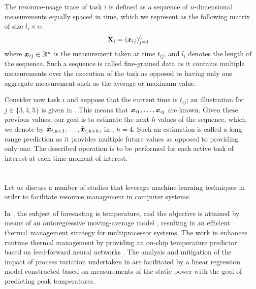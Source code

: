 The resource-usage trace of task $i$ is defined as a sequence of $n$-dimensional
measurements equally spaced in time, which we represent as the following matrix
of size $l_i \times n$:
\[
  \mathbf{X}_i = (\boldsymbol{x}_{ij})_{j = 1}^{l_i}
\]
where $\boldsymbol{x}_{ij} \in \mathbb{R}^n$ is the measurement taken at time $t_{ij}$, and
$l_i$ denotes the length of the sequence. Such a sequence is called fine-grained
data as it contains multiple measurements over the execution of the task as
opposed to having only one aggregate measurement such as the average or maximum
value.

Consider now task $i$ and suppose that the current time is $t_{ij}$; an
illustration for $j \in \{3, 4, 5\}$ is given in . This
means that $\boldsymbol{x}_{i1}, \dots, \boldsymbol{x}_{ij}$ are known. Given these previous values,
our goal is to estimate the next $h$ values of the sequence, which we denote by
$\hat{\boldsymbol{x}}_{i,k + 1}, \dots, \hat{\boldsymbol{x}}_{i,k + h}$; in ,
$h = 4$. Such an estimation is called a long-range prediction as it provides
multiple future values as opposed to providing only one. The described operation
is to be performed for each active task of interest at each time moment of
interest.

\section{\priortitle}

Let us discuss a number of studies that leverage machine-learning techniques in
order to facilitate resource management in computer systems.

In \cite{coskun2008}, the subject of forecasting is temperature, and the
objective is attained by means of an autoregressive moving-average model
\cite{hastie2013}, resulting in an efficient thermal management strategy for
multiprocessor systems. The work in \cite{kumar2010} enhances runtime thermal
management by providing an on-chip temperature predictor based on feed-forward
neural networks \cite{hastie2013}. The analysis and mitigation of the impact of
process variation undertaken in \cite{juan2014} are facilitated by a linear
regression model \cite{hastie2013} constructed based on measurements of the
static power with the goal of predicting peak temperatures.


